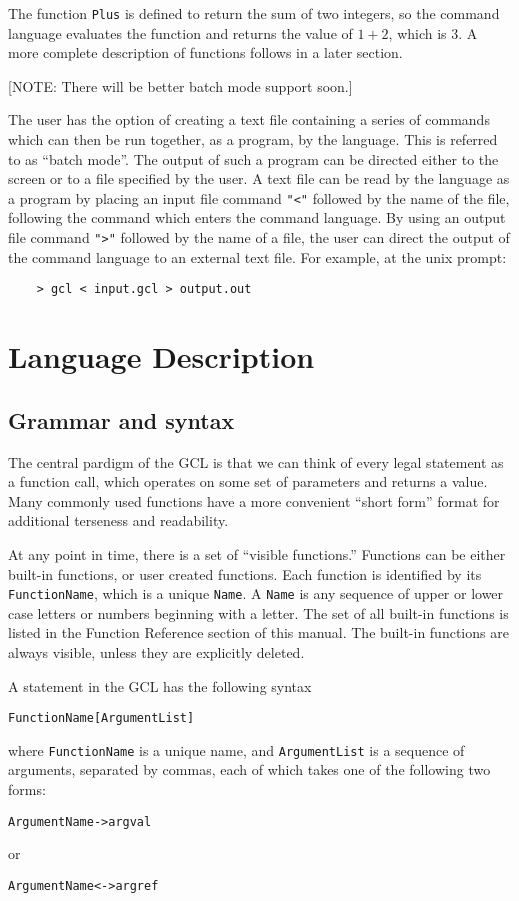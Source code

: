 The function \verb+Plus+ is defined to return the sum of two integers,
so the command language evaluates the function and returns the value of
$1 + 2$, which is 3.  A more complete description of functions follows in
a later section.

[NOTE: There will be better batch mode support soon.]

The user has the option of creating a text file containing a series of
commands which can then be run together, as a program, by the
language.  This is referred to as ``batch mode''.
The output of such a program can be directed either to the
screen or to a file specified by the user.  A text file can be read by
the language as a program by placing an input file command {\tt "<"}
followed by the name of the file, following the command which enters
the command language.  By using an output file command {\tt ">"}
followed by the name of a file, the user can direct the output of the
command language to an external text file.  For example, at the unix prompt:

\begin{verbatim}
	> gcl < input.gcl > output.out
\end{verbatim}

\section{Language Description}

\subsection{Grammar and syntax}

The central pardigm of the GCL is that we can think of every legal
statement as a function call, which operates on some set of parameters and
returns a value.  Many commonly used functions have a more convenient
``short form'' format for additional terseness and readability.

At any point in time, there is a set of ``visible functions.''
Functions can be either built-in functions, or user created functions.
Each function is identified by its \verb+FunctionName+, which is a
unique \verb+Name+.  A \verb+Name+ is any sequence of upper or lower
case letters or numbers beginning with a letter.  The set of all
built-in functions is listed in the Function Reference section of this
manual.  The built-in functions are always visible, unless they are
explicitly deleted.

A statement in the GCL has the
following syntax
\begin{verbatim}
FunctionName[ArgumentList]
\end{verbatim}
where \verb+FunctionName+ is a unique name, and \verb+ArgumentList+ is
a sequence of arguments, separated by commas, each of which takes one
of the following two forms:
\begin{verbatim}
ArgumentName->argval
\end{verbatim}
or
\begin{verbatim}
ArgumentName<->argref
\end{verbatim}


